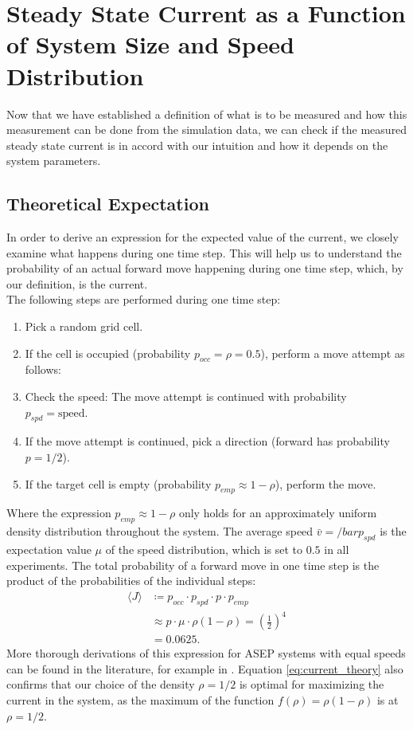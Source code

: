 \section{Steady State Current as a Function of System Size and Speed Distribution}
\label{sec:steady_state_current}
Now that we have established a definition of what is to be measured and how this measurement can be done from the simulation data, we can check if the measured steady state current is in accord with our intuition and how it depends on the system parameters. 

\subsection{Theoretical Expectation}
\label{sec:theoretical_expectations}
In order to derive an expression for the expected value of the current, we closely examine what happens during one time step. This will help us to understand the probability of an actual forward move happening during one time step, which, by our definition, is the current.
\\
The following steps are performed during one time step:
\begin{enumerate}
    \item Pick a random grid cell.
    \item If the cell is occupied (probability $p_{occ}=\rho=0.5$), perform a move attempt as follows:
    \item Check the speed: The move attempt is continued with probability $p_{spd}=\text{speed}$.
    \item If the move attempt is continued, pick a direction (forward has probability $p=1/2$).
    \item If the target cell is empty (probability $p_{emp}\approx 1-\rho$), perform the move.
\end{enumerate}
Where the expression $p_{emp}\approx 1-\rho$ only holds for an approximately uniform density distribution throughout the system. The average speed $\bar{v} = /bar{p_{spd}}$ is the expectation value $\mu$ of the speed distribution, which is set to $0.5$ in all experiments. The total probability of a forward move in one time step is the product of the probabilities of the individual steps:
\begin{align}
    \langle J\rangle &\coloneqq p_{occ} \cdot p_{spd} \cdot p \cdot p_{emp} \label{eq:current_theory} \\
                     &\approx p \cdot \mu \cdot \rho (1-\rho) = \left(\frac{1}{2}\right)^4 \nonumber \\
                     &= 0.0625 \text{.}\nonumber
\end{align}
More thorough derivations of this expression for ASEP systems with equal speeds can be found in the literature, for example in \cite[section 2.3.2]{daquila_monte_nodate}. Equation \ref{eq:current_theory} also confirms that our choice of the density $\rho=1/2$ is optimal for maximizing the current in the system, as the maximum of the function $f(\rho) = \rho(1-\rho)$ is at $\rho=1/2$.


